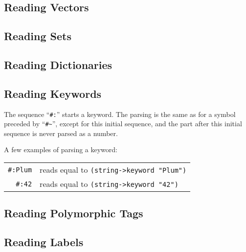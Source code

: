 \subsection{Reading Vectors}
\label{subsec:aml-base-lang-reader-vectors}





\subsection{Reading Sets}
\label{subsec:aml-base-lang-reader-sets}





\subsection{Reading Dictionaries}
\label{subsec:aml-base-lang-reader-dictionaries}





\subsection{Reading Keywords}
\label{subsec:aml-base-lang-reader-keywords}

The sequence ``\lstinline!#:!'' starts a keyword. The parsing is the same as for a symbol preceded by ``\lstinline!#~!'', except for this initial sequence, and the part after this initial sequence is never parsed as a number. 

\example A few examples of parsing a keyword:

\begin{tabular}{ r l }
  \lstinline!#:Plum! & reads equal to \lstinline!(string->keyword "Plum")! \\
  \lstinline!#:42! & reads equal to \lstinline!(string->keyword "42")! \\
\end{tabular}







\subsection{Reading Polymorphic Tags}
\label{subsec:aml-base-lang-reader-polytags}





\subsection{Reading Labels}
\label{subsec:aml-base-lang-reader-labels}





